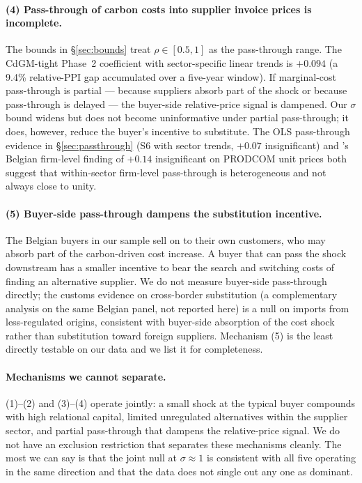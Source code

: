 \paragraph{(4) Pass-through of carbon costs into supplier invoice prices is incomplete.} The bounds in \S\ref{sec:bounds} treat $\rho \in [0.5, 1]$ as the pass-through range. The CdGM-tight Phase~2 coefficient with sector-specific linear trends is $+0.094$ (a 9.4\% relative-PPI gap accumulated over a five-year window). If marginal-cost pass-through is partial --- because suppliers absorb part of the shock or because pass-through is delayed --- the buyer-side relative-price signal is dampened. Our $\sigma$ bound widens but does not become uninformative under partial pass-through; it does, however, reduce the buyer's incentive to substitute. The OLS pass-through evidence in \S\ref{sec:passthrough} (S6 with sector trends, $+0.07$ insignificant) and \citet{martin2014}'s Belgian firm-level finding of $+0.14$ insignificant on PRODCOM unit prices both suggest that within-sector firm-level pass-through is heterogeneous and not always close to unity.

\paragraph{(5) Buyer-side pass-through dampens the substitution incentive.} The Belgian buyers in our sample sell on to their own customers, who may absorb part of the carbon-driven cost increase. A buyer that can pass the shock downstream has a smaller incentive to bear the search and switching costs of finding an alternative supplier. We do not measure buyer-side pass-through directly; the customs evidence on cross-border substitution (a complementary analysis on the same Belgian panel, not reported here) is a null on imports from less-regulated origins, consistent with buyer-side absorption of the cost shock rather than substitution toward foreign suppliers. Mechanism (5) is the least directly testable on our data and we list it for completeness.

\paragraph{Mechanisms we cannot separate.} (1)--(2) and (3)--(4) operate jointly: a small shock at the typical buyer compounds with high relational capital, limited unregulated alternatives within the supplier sector, and partial pass-through that dampens the relative-price signal. We do not have an exclusion restriction that separates these mechanisms cleanly. The most we can say is that the joint null at $\sigma \approx 1$ is consistent with all five operating in the same direction and that the data does not single out any one as dominant.

